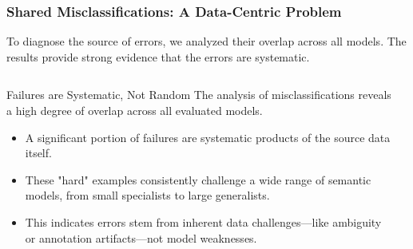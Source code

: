 \documentclass[aspectratio=169,10pt]{beamer}
\begin{document}
\begin{frame}
    \frametitle{Shared Misclassifications: A Data-Centric Problem}
    
    To diagnose the source of errors, we analyzed their overlap across all models. The results provide strong evidence that the errors are systematic.

    \begin{columns}[T]
        \begin{column}{0.5\textwidth}
            \begin{block}{Failures are Systematic, Not Random}
                The analysis of misclassifications reveals a high degree of overlap across all evaluated models.
                \begin{itemize}
                    \item A significant portion of failures are systematic products of the source data itself.
                    
                    \item These "hard" examples consistently challenge a wide range of semantic models, from small specialists to large generalists.
                    
                    \item This indicates errors stem from inherent data challenges—like ambiguity or annotation artifacts—not model weaknesses.
                \end{itemize}
            \end{block}
        \end{column}
        
        \begin{column}{0.45\textwidth}
            

\end{column}
\end{columns}
\end{frame}
\end{document}
